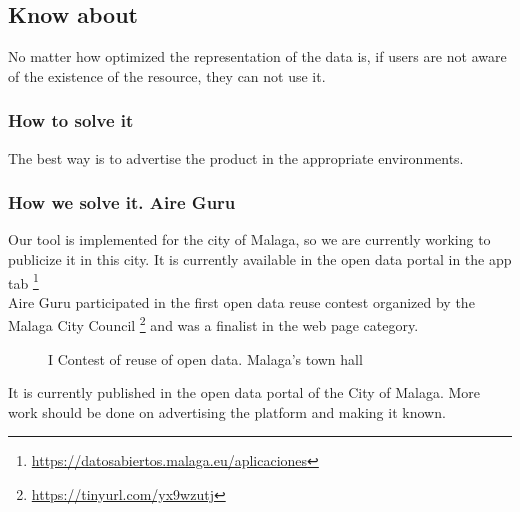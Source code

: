 \subsection{Know about}

No matter how optimized the representation of the data is, if users are not aware of the existence of the resource, they can not use it.

\subsubsection{How to solve it} 
The best way is to advertise the product in the appropriate environments.
\subsubsection{How we solve it. Aire Guru} 
Our tool is implemented for the city of Malaga, so we are currently working to publicize it in this city.
It is currently available in the open data portal in the app tab \footnote {\url {https://datosabiertos.malaga.eu/aplicaciones}} \\
Aire Guru participated in the first open data reuse contest organized by the Malaga City Council \footnote {\url {https://tinyurl.com/yx9wzutj}}
and was a finalist in the web page category.


\begin{figure}[ht]
    \centering
   \hfill
 
    \caption{I Contest of reuse of open data. Malaga's town hall}
    \end{figure}

\begin{itemize}
    \done It is currently published in the open data portal of the City of Malaga.
\crossed More work should be done on advertising the platform and making it known.
\end{itemize}
\newpage